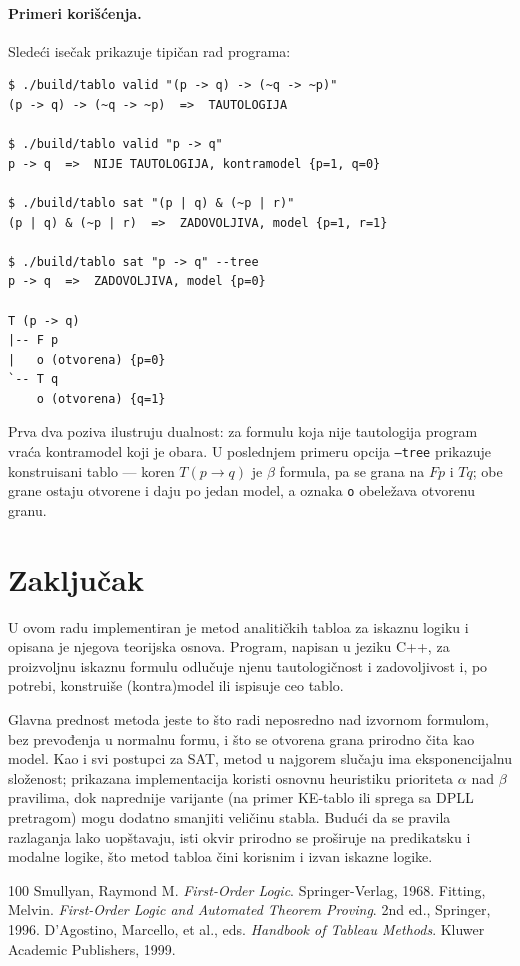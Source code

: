 \documentclass[a4paper,10pt]{article}
\begin{document}
\paragraph{Primeri korišćenja.}
Sledeći isečak prikazuje tipičan rad programa:
\begin{verbatim}
$ ./build/tablo valid "(p -> q) -> (~q -> ~p)"
(p -> q) -> (~q -> ~p)  =>  TAUTOLOGIJA

$ ./build/tablo valid "p -> q"
p -> q  =>  NIJE TAUTOLOGIJA, kontramodel {p=1, q=0}

$ ./build/tablo sat "(p | q) & (~p | r)"
(p | q) & (~p | r)  =>  ZADOVOLJIVA, model {p=1, r=1}

$ ./build/tablo sat "p -> q" --tree
p -> q  =>  ZADOVOLJIVA, model {p=0}

T (p -> q)
|-- F p
|   o (otvorena) {p=0}
`-- T q
    o (otvorena) {q=1}
\end{verbatim}
Prva dva poziva ilustruju dualnost: za formulu koja nije tautologija program
vraća kontramodel koji je obara. U poslednjem primeru opcija \texttt{--tree}
prikazuje konstruisani tablo --- koren $T(p \rightarrow q)$ je $\beta$ formula,
pa se grana na $Fp$ i $Tq$; obe grane ostaju otvorene i daju po jedan model, a
oznaka \texttt{o} obeležava otvorenu granu.

\section{Zaključak}
\label{sec:zakljucak}

U ovom radu implementiran je metod analitičkih tabloa za iskaznu logiku i
opisana je njegova teorijska osnova. Program, napisan u jeziku C++, za
proizvoljnu iskaznu formulu odlučuje njenu tautologičnost i zadovoljivost i,
po potrebi, konstruiše (kontra)model ili ispisuje ceo tablo.

Glavna prednost metoda jeste to što radi neposredno nad izvornom formulom, bez
prevođenja u normalnu formu, i što se otvorena grana prirodno čita kao model.
Kao i svi postupci za SAT, metod u najgorem slučaju ima eksponencijalnu
složenost; prikazana implementacija koristi osnovnu heuristiku prioriteta
$\alpha$ nad $\beta$ pravilima, dok naprednije varijante (na primer KE-tablo
ili sprega sa DPLL pretragom) mogu dodatno smanjiti veličinu stabla. Budući da
se pravila razlaganja lako uopštavaju, isti okvir prirodno se proširuje na
predikatsku i modalne logike, što metod tabloa čini korisnim i izvan iskazne
logike.

\begin{thebibliography}{100}
 Smullyan, Raymond M. \emph{First-Order Logic}.
Springer-Verlag, 1968.
 Fitting, Melvin. \emph{First-Order Logic and Automated
Theorem Proving}. 2nd ed., Springer, 1996.
 D'Agostino, Marcello, et al., eds. \emph{Handbook of
Tableau Methods}. Kluwer Academic Publishers, 1999.
\end{thebibliography}
\end{document}
